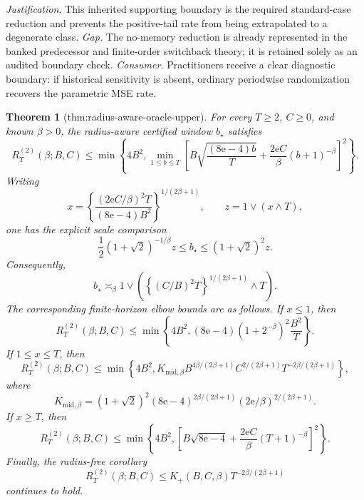\documentclass{article}
\newtheorem{theorem}{Theorem}
\begin{document}
\par\smallskip\noindent \textit{Justification.} This inherited supporting boundary is the required standard-case reduction and prevents the positive-tail rate from being extrapolated to a degenerate class. \textit{Gap.} The no-memory reduction is already represented in the banked predecessor and finite-order switchback theory; it is retained solely as an audited boundary check. \textit{Consumer.} Practitioners receive a clear diagnostic boundary: if historical sensitivity is absent, ordinary periodwise randomization recovers the parametric MSE rate.

\begin{theorem}[thm:radius-aware-oracle-upper]\label{thm:radius-aware-oracle-upper}
For every \(T\ge2\), \(C\ge0\), and known \(\beta>0\), the radius-aware certified window \(b_\star\) satisfies
\[
 R_T^{(2)}(\beta;B,C)
 \le
 \min\!\left\{
 4B^2,
 \min_{1\le b\le T}
 \left[
 B\sqrt{\frac{(8\mathrm e-4)b}{T}}
 +\frac{2\mathrm e C}{\beta}(b+1)^{-\beta}
 \right]^2
 \right\}.
\]
Writing
\[
 x=\left\{
 \frac{(2\mathrm e C/\beta)^2T}{(8\mathrm e-4)B^2}
 \right\}^{1/(2\beta+1)},
 \qquad z=1\vee(x\wedge T),
\]
one has the explicit scale comparison
\[
 \frac12(1+\sqrt2)^{-1/\beta}z
 \le b_\star\le(1+\sqrt2)^2z.
\]
Consequently,
\[
 b_\star\asymp_\beta
 1\vee\left(
 \left\{(C/B)^2T\right\}^{1/(2\beta+1)}\wedge T
 \right).
\]
The corresponding finite-horizon elbow bounds are as follows.  If \(x\le1\), then
\[
 R_T^{(2)}(\beta;B,C)
 \le
 \min\left\{4B^2,(8\mathrm e-4)(1+2^{-\beta})^2\frac{B^2}{T}\right\}.
\]
If \(1\le x\le T\), then
\[
 R_T^{(2)}(\beta;B,C)
 \le
 \min\left\{4B^2,
 K_{\mathrm{mid},\beta}
 B^{4\beta/(2\beta+1)}C^{2/(2\beta+1)}
 T^{-2\beta/(2\beta+1)}
 \right\},
\]
where
\[
 K_{\mathrm{mid},\beta}
 =(1+\sqrt2)^2(8\mathrm e-4)^{2\beta/(2\beta+1)}
 (2\mathrm e/\beta)^{2/(2\beta+1)}.
\]
If \(x\ge T\), then
\[
 R_T^{(2)}(\beta;B,C)
 \le
 \min\left\{4B^2,
 \left[B\sqrt{8\mathrm e-4}
 +\frac{2\mathrm e C}{\beta}(T+1)^{-\beta}\right]^2
 \right\}.
\]
Finally, the radius-free corollary
\[
 R_T^{(2)}(\beta;B,C)
 \le K_+(B,C,\beta)T^{-2\beta/(2\beta+1)}
\]
continues to hold.
\end{theorem}
\end{document}
